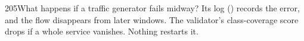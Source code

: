 \begin{qa}{205}{What happens if a traffic generator fails midway?}
Its log () records the error, and the flow disappears from later windows.
The validator's class-coverage score drops if a whole service vanishes. Nothing restarts it.
\end{qa}
